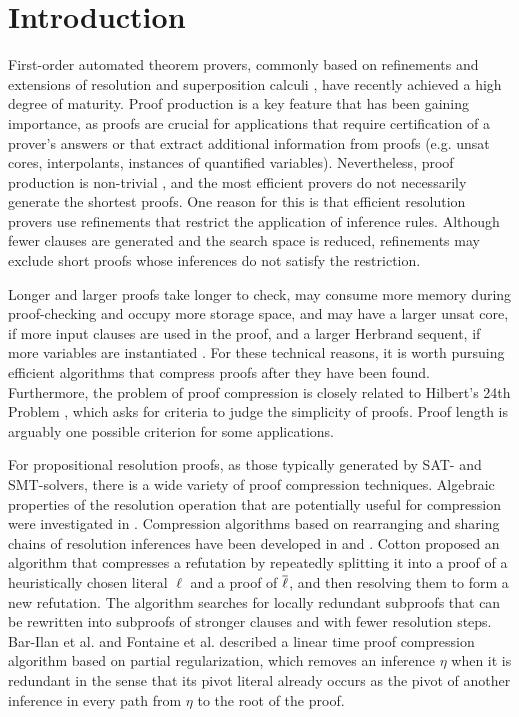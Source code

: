 \section{Introduction} 

First-order automated theorem provers, commonly based on refinements and extensions of resolution and superposition calculi \cite{Vampire,EProver,Spass,spassT,Beagle,cruanes2015extending,prover9-mace4}, have recently achieved a high degree of maturity. Proof production is a key feature that has been gaining importance, as proofs are crucial for applications that require certification of a prover's answers or that extract additional information from proofs (e.g. unsat cores, interpolants, instances of quantified variables). Nevertheless, proof production is non-trivial \cite{SchulzAPPA}, and the most efficient provers do not necessarily generate the shortest proofs. One reason for this is that efficient resolution provers use refinements that restrict the application of inference rules. Although fewer clauses are generated and the search space is reduced, refinements may exclude short proofs whose inferences do not satisfy the restriction.

Longer and larger proofs take longer to check, may consume more memory during proof-checking and occupy more storage space, and may have a larger unsat core, if more input clauses are used in the proof, and a larger Herbrand sequent, if more variables are instantiated \cite{B10,B12,B16,ResolutionHerbrand,Reis}. For these technical reasons, it is worth pursuing efficient algorithms that compress proofs after they have been found. Furthermore, the problem of proof compression is closely related to Hilbert's 24th Problem \cite{Hilbert24Problem}, which asks for criteria to judge the simplicity of proofs. Proof length is arguably one possible criterion for some applications.

For propositional resolution proofs, as those typically generated by SAT- and SMT-solvers, there is a wide variety of proof compression techniques. Algebraic properties of the resolution operation that are potentially useful for compression were investigated in \cite{bwp10}.
Compression algorithms based on rearranging and sharing chains of resolution inferences have been
developed in \cite{Amjad07} and \cite{Sinz}.  Cotton \cite{CottonSplit} proposed an algorithm that
compresses a refutation by repeatedly splitting it into a proof of a heuristically chosen literal $\ell$
and a proof of $\overline{\ell}$, and then resolving them to form a new refutation.  The {\ReduceReconstruct} algorithm \cite{RedRec} searches for locally redundant
subproofs that can be rewritten into subproofs of stronger clauses and with fewer resolution steps.
Bar-Ilan et al. \cite{RP08} and Fontaine et al. \cite{LURPI} described a linear time proof compression algorithm based on partial
regularization, which removes an inference $\eta$ when it is redundant in the sense that its pivot literal already occurs as the pivot of another inference in every path from $\eta$ to the root of the proof.

